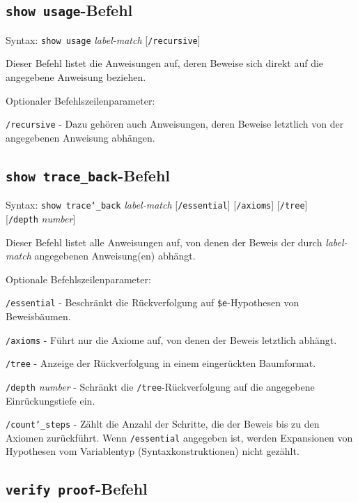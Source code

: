 \subsection{\texttt{show usage}-Befehl}

Syntax:  \texttt{show usage} {\em label-match} [\texttt{/recursive}]

Dieser Befehl listet die Anweisungen auf, deren Beweise sich direkt auf die angegebene Anweisung beziehen.

Optionaler Befehlszeilenparameter:

    \texttt{/recursive} - Dazu gehören auch Anweisungen, deren Beweise letztlich von der angegebenen Anweisung abhängen.


\subsection{\texttt{show trace\_back}-Befehl}

Syntax:  \texttt{show trace{\char`\_}back} {\em label-match} [\texttt{/essential}] [\texttt{/axioms}]
    [\texttt{/tree}] {\\} [\texttt{/depth} {\em number}]

Dieser Befehl listet alle Anweisungen auf, von denen der Beweis der durch {\em label-match} angegebenen Anweisung(en) abhängt.

Optionale Befehlszeilenparameter:

    \texttt{/essential} - Beschränkt die Rückverfolgung auf \texttt{\$e}-Hypothesen von Beweisbäumen.

    \texttt{/axioms} - Führt nur die Axiome auf, von denen der Beweis letztlich abhängt.

    \texttt{/tree} - Anzeige der Rückverfolgung in einem eingerückten Baumformat.

    \texttt{/depth} {\em number} - Schränkt die \texttt{/tree}-Rückverfolgung auf die angegebene Einrückungstiefe ein.

    \texttt{/count{\char`\_}steps} - Zählt die Anzahl der Schritte, die der Beweis bis zu den Axiomen zurückführt.  Wenn \texttt{/essential} angegeben ist, werden Expansionen von Hypothesen vom Variablentyp (Syntaxkonstruktionen) nicht gezählt.


\subsection{\texttt{verify proof}-Befehl}

